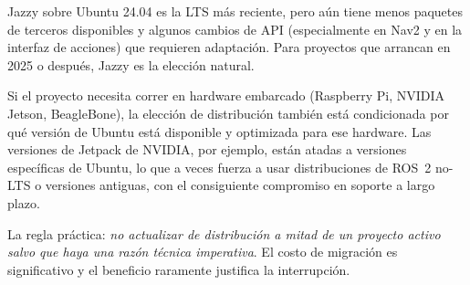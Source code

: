 Jazzy sobre Ubuntu 24.04 es la LTS más reciente, pero aún tiene menos paquetes de terceros disponibles y algunos cambios de API (especialmente en Nav2 y en la interfaz de acciones) que requieren adaptación. Para proyectos que arrancan en 2025 o después, Jazzy es la elección natural.

Si el proyecto necesita correr en hardware embarcado (Raspberry Pi, NVIDIA Jetson, BeagleBone), la elección de distribución también está condicionada por qué versión de Ubuntu está disponible y optimizada para ese hardware. Las versiones de Jetpack de NVIDIA, por ejemplo, están atadas a versiones específicas de Ubuntu, lo que a veces fuerza a usar distribuciones de ROS~2 no-LTS o versiones antiguas, con el consiguiente compromiso en soporte a largo plazo.

La regla práctica: \textit{no actualizar de distribución a mitad de un proyecto activo salvo que haya una razón técnica imperativa}. El costo de migración es significativo y el beneficio raramente justifica la interrupción.
